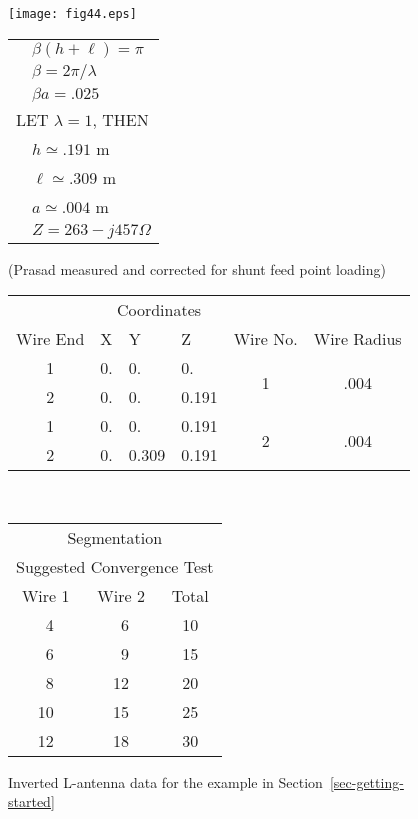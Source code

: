 \documentclass[12pt]{article}
\begin{document}
\begin{figure}[htb]
\begin{center}
\texttt{[image: fig44.eps]}
\ \\
\begin{tabular}{ll}
 & $\beta(h+\ell) = \pi$   \\
 & $\beta = 2\pi/\lambda$  \\
 & $\beta a = .025$        \\
\multicolumn{2}{l}{LET $\lambda = 1$, THEN} \\
 & $h   \simeq .191$ m    \\
 & $\ell\simeq .309$ m    \\
 & $a   \simeq .004$ m    \\
 & $Z = 263 - j457\Omega$ \\
\end{tabular}

(Prasad \cite{r18} measured and
corrected for shunt feed
point loading)
\ \\[5mm]
\begin{tabular}{c|l|l|l|c|c}
& \multicolumn{3}{c|}{Coordinates} & & \\
\cline{2-4}
Wire End & X  & Y      & Z     & Wire No. & Wire Radius \\
\hline
1        & 0. & 0.     & 0.    & \multirow{2}{*}{1} & \multirow{2}{*}{.004} \\
\cline{1-4}
2        & 0. & 0.     & 0.191 &                    & \\
\hline
1        & 0. & 0.     & 0.191 & \multirow{2}{*}{2} & \multirow{2}{*}{.004} \\
\cline{1-4}
2        & 0. & 0.309  & 0.191 &                    & \\
\end{tabular}
\ \\[5mm]
\begin{tabular}{c|c|c}
\multicolumn{3}{c}{Segmentation}                \\
\multicolumn{3}{c}{Suggested Convergence Test}  \\
Wire 1 & Wire 2 & Total \\
\hline
\ 4 & \ 6 & 10 \\
\ 6 & \ 9 & 15 \\
\ 8 & 12  & 20 \\
10  & 15  & 25 \\
12  & 18  & 30 \\
\end{tabular}
\end{center}
\caption{Inverted L-antenna data for the example in
Section~\ref{sec-getting-started}}
\label{fig44}
\end{figure}
\afterpage\clearpage
\end{document}
